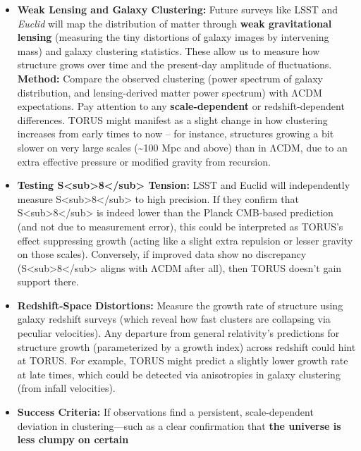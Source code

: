 \begin{itemize}
  \begin{itemize}
  \item
    \textbf{Weak Lensing and Galaxy Clustering:} Future surveys like
    LSST and \emph{Euclid} will map the distribution of matter through
    \textbf{weak gravitational lensing} (measuring the tiny distortions
    of galaxy images by intervening mass) and galaxy clustering
    statistics. These allow us to measure how structure grows over time
    and the present-day amplitude of fluctuations. \textbf{Method:}
    Compare the observed clustering (power spectrum of galaxy
    distribution, and lensing-derived matter power spectrum) with ΛCDM
    expectations. Pay attention to any \textbf{scale-dependent} or
    redshift-dependent differences. TORUS might manifest as a slight
    change in how clustering increases from early times to now -- for
    instance, structures growing a bit slower on very large scales
    (\textasciitilde{}100 Mpc and above) than in ΛCDM, due to an extra
    effective pressure or modified gravity from recursion.
  \item
    \textbf{Testing
    S\textless{}sub\textgreater{}8\textless{}/sub\textgreater{}
    Tension:} LSST and Euclid will independently measure
    S\textless{}sub\textgreater{}8\textless{}/sub\textgreater{} to high
    precision. If they confirm that
    S\textless{}sub\textgreater{}8\textless{}/sub\textgreater{} is
    indeed lower than the Planck CMB-based prediction (and not due to
    measurement error), this could be interpreted as TORUS's effect
    suppressing growth (acting like a slight extra repulsion or lesser
    gravity on those scales)​. Conversely, if improved data show no
    discrepancy
    (S\textless{}sub\textgreater{}8\textless{}/sub\textgreater{} aligns
    with ΛCDM after all), then TORUS doesn't gain support there.
  \item
    \textbf{Redshift-Space Distortions:} Measure the growth rate of
    structure using galaxy redshift surveys (which reveal how fast
    clusters are collapsing via peculiar velocities). Any departure from
    general relativity's predictions for structure growth (parameterized
    by a growth index) across redshift could hint at TORUS. For example,
    TORUS might predict a slightly lower growth rate at late times,
    which could be detected via anisotropies in galaxy clustering (from
    infall velocities).
  \item
    \textbf{Success Criteria:} If observations find a persistent,
    scale-dependent deviation in clustering---such as a clear
    confirmation that \textbf{the universe is less clumpy on certain
}
\end{itemize}
\end{itemize}
